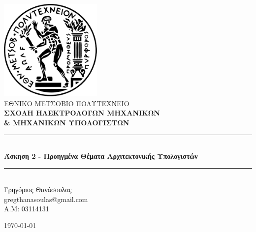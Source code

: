 \documentclass[12pt]{article}
\begin{document}
\sloppy
\begin{titlepage}



\newcommand{\HRule}{\rule{\linewidth}{0.5mm}}
\center
\includegraphics[width=50mm,scale=0.5]{imgs/logo.png}\\[1cm]
\textsc{\LARGE ΕΘΝΙΚΟ ΜΕΤΣΟΒΙΟ ΠΟΛΥΤΕΧΝΕΙΟ}\\[0.05cm] %
\textsc{\textbf{\Large ΣΧΟΛΗ ΗΛΕΚΤΡΟΛΟΓΩΝ ΜΗΧΑΝΙΚΩΝ \\ \& ΜΗΧΑΝΙΚΩΝ ΥΠΟΛΟΓΙΣΤΩΝ}}\\[1.cm] %

\vspace{05mm}
\HRule \\[0.4cm]
{ \huge \bfseries Άσκηση 2 - Προηγμένα Θέματα Αρχιτεκτονικής Υπολογιστών }\\[0.4cm] 
\HRule \\[1.5cm]
 
\center
{\Large Γρηγόριος Θανάσουλας \\ \vspace{1em} gregthanasoulas@gmail.com \\ \vspace{5mm} \Large A.M: 03114131} \\
\vspace{15mm}

{\large \today} %
\vfill

\end{titlepage}
\newpage
\tableofcontents
\newpage
\end{document}
